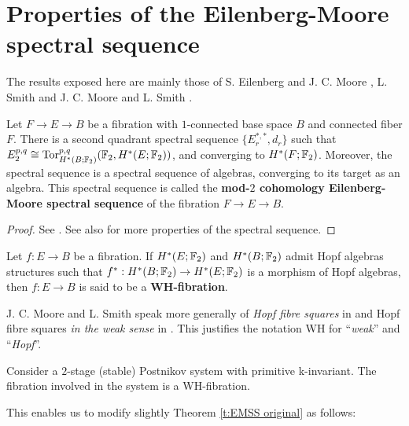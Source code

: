 \section{Properties of the Eilenberg-Moore spectral sequence}

The results exposed here are mainly those of S. Eilenberg and J. C. Moore \cite{EM66}, L. Smith \cite{Sm70} \cite{Sm67} and J. C. Moore and L. Smith \cite{MS68-I} \cite{MS68-II}.

\begin{thm}\label{t:EMSS original}
Let $F\to E\to B$ be a fibration with $1$-connected base space $B$ and connected fiber $F$. There is a second quadrant spectral sequence $\{E_r^{*,*},d_r\}$ such that $E_2^{p,q}\cong\operatorname{Tor}_{H^*(B;\mathbb{F}_2)}^{p,q}(\mathbb{F}_2,H^*(E;\mathbb{F}_2))$, and converging to $H^*(F;\mathbb{F}_2)$. Moreover, the spectral sequence is a spectral sequence of algebras, converging to its target as an algebra. This spectral sequence is called the {\bf mod-$2$ cohomology Eilenberg-Moore spectral sequence} of the fibration $F\to E\to B$.
\end{thm}

\begin{proof}
See \cite[Corollary 7.16, p. 252 and Corollary 7.18, p. 256]{Mc00}. See also \cite[Theorem 6.2, pp. 51-52]{Sm70} for more properties of the spectral sequence.
\end{proof}

\begin{defn}
Let $f:E\to B$ be a fibration. If $H^*(E;\mathbb{F}_2)$ and $H^*(B;\mathbb{F}_2)$ admit Hopf algebras structures such that $f^*:H^*(B;\mathbb{F}_2)\to H^*(E;\mathbb{F}_2)$ is a morphism of Hopf algebras, then $f:E\to B$ is said to be a {\bf WH-fibration}.
\end{defn}

\begin{rem*}
J. C. Moore and L. Smith speak more generally of {\it Hopf fibre squares} in \cite[p. 56]{Sm70} and Hopf fibre squares {\it in the weak sense} in \cite[Appendix: Generalizations, pp. 779-780]{MS68-I}. This justifies the notation WH for ``{\it weak}'' and ``{\it Hopf}''.
\end{rem*}

\begin{exmp}
Consider a $2$-stage (stable) Postnikov system with primitive k-invariant. The fibration involved in the system is a WH-fibration.
\end{exmp}

This enables us to modify slightly Theorem \ref{t:EMSS original} as follows:


